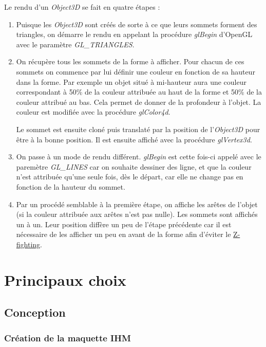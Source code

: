 \documentclass[11pt]{report}
\begin{document}
Le rendu d'un \textit{Object3D} se fait en quatre étapes :
\begin{enumerate}
    \item Puisque les \textit{Object3D} sont créés de sorte à ce que leurs sommets forment des triangles, on démarre le rendu en appelant la procédure \textit{glBegin} d'OpenGL avec le paramètre \textit{GL\_TRIANGLES}.

    \item On récupère tous les sommets de la forme à afficher. Pour chacun de ces sommets on commence par lui définir une couleur en fonction de sa hauteur dans la forme. Par exemple un objet situé à mi-hauteur aura une couleur correspondant à 50\% de la couleur attribuée au haut de la forme et 50\% de la couleur attribué au bas. Cela permet de donner de la profondeur à l'objet. La couleur est modifiée avec la procédure \textit{glColor4d}.

    Le sommet est ensuite cloné puis translaté par la position de l'\textit{Object3D} pour être à la bonne position. Il est ensuite affiché avec la procédure \textit{glVertex3d}.

    \item On passe à un mode de rendu différent. \textit{glBegin} est cette fois-ci appelé avec le paremètre \textit{GL\_LINES} car on souhaite dessiner des ligne, et que la couleur n'est attribuée qu'une seule fois, dès le départ, car elle ne change pas en fonction de la hauteur du sommet.
    \item Par un procédé semblable à la première étape, on affiche les arêtes de l'objet (si la couleur attribuée aux arêtes n'est pas nulle). Les sommets sont affichés un à un. Leur position diffère un peu de l'étape précédente car il est nécessaire de les afficher un peu en avant de la forme afin d'éviter le \href{https://www.google.com/search?q=z-fighting&oq=z-f&aqs=chrome.2.69i57j0l2j46i175i199j0l6.2593j0j4&sourceid=chrome&ie=UTF-8}{\color{blue}Z-fighting}.
\end{enumerate}

\chapter{Principaux choix}

\section{Conception}

\subsection{Création de la maquette IHM}
\end{document}
